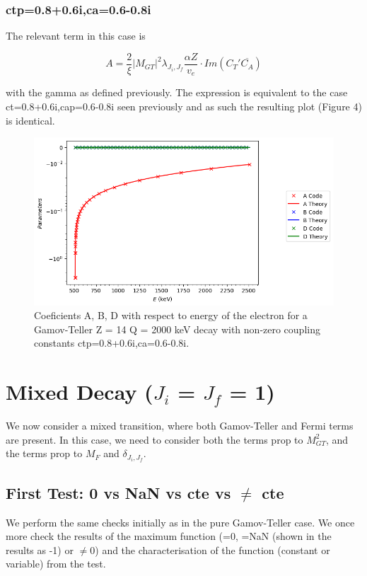 \documentclass[twocolumn]{article}
\begin{document}
\subsubsection*{ctp=0.8+0.6i,ca=0.6-0.8i}

The relevant term in this case is 

$$A= \frac{2}{\xi}|M_{GT}|^2\lambda_{J_i,J_f}\frac{\alpha Z}{v_e}\cdot Im(C_T'\overline{C_A})$$

with the gamma as defined previously. The expression is equivalent to the case ct=0.8+0.6i,cap=0.6-0.8i seen previously and as such the resulting plot (Figure 4) is identical.


\begin{figure}
	\centering
	\includegraphics[width=\columnwidth]{plots/ctcap_comp_gt_result.png}
	\caption{Coeficients A, B, D with respect to energy of the electron for a Gamov-Teller Z = 14 Q = 2000 keV decay  with non-zero coupling constants ctp=0.8+0.6i,ca=0.6-0.8i.}
\end{figure}

\section{Mixed Decay ($J_i$ = $J_f$ = 1)}

We now consider a mixed transition, where both Gamov-Teller and Fermi terms are present. In this case, we need to consider both the terms prop to $M^2_{GT}$, and the terms prop to $M_F$ and $\delta_{J_i,J_f}$. 


\subsection{First Test: 0 vs NaN vs cte vs $\neq$ cte}

We perform the same checks initially as in the pure Gamov-Teller case. We once more check the results of the maximum function (=0, =NaN (shown in the results as -1) or $\neq$0) and the characterisation of the function (constant or variable) from the test. 
\end{document}
